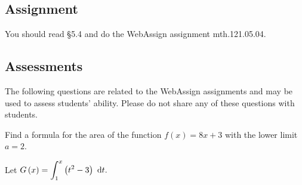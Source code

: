 \documentclass[12pt,addpoints, answers, fleqn]{exam}
\begin{document}
\subsection{Assignment}
You should read \S  5.4 and do the WebAssign assignment mth.121.05.04.
\vfill
\pagebreak

\begin{teacher}
\subsection{Assessments}
The following questions are related to the WebAssign assignments and may be used to assess students' ability. Please do not share any of these questions with students.
\begin{questions}	
\question 	%

Find a formula for the area of the function $f\left(x\right) = 8x + 3$ with the lower limit $a = 2$.
\begin{solution}
\end{solution}

\question 	%

Let $G\left( x \right) = \displaystyle \int_1^x \left( t^2 - 3 \right) \ {\rm{d}} t.$



\end{questions}
\end{teacher}
\end{document}
